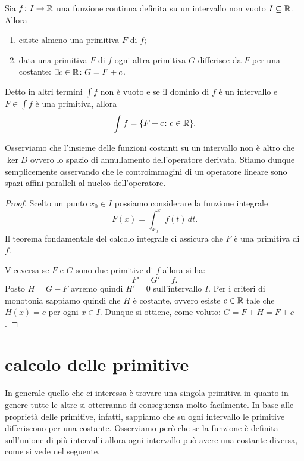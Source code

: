 \begin{theorem}
\label{th:primitive}
\mymark{***}
Sia $f\colon I \to \mathbb R$
una funzione continua definita su un intervallo non vuoto $I\subseteq \mathbb R$. Allora
\begin{enumerate}
\item esiste almeno una primitiva $F$ di $f$;
\item data una primitiva $F$ di $f$ ogni altra
primitiva $G$ differisce da $F$ per una costante: $\exists c\in \mathbb R\colon G= F+c$.
\end{enumerate}

Detto in altri termini $\int f$ non è vuoto e se il dominio di $f$ è un
intervallo e
$F\in \int f$ è una primitiva, allora
\[
  \int f = {\left\{ F+c \colon c \in \mathbb R \right\}}.
\]
\end{theorem}

Osserviamo che l'insieme delle funzioni costanti
su un intervallo
non è altro che $\ker D$ ovvero lo spazio di annullamento dell'operatore derivata.
Stiamo dunque semplicemente osservando che le controimmagini di un operatore
lineare sono spazi affini paralleli al nucleo dell'operatore.

\begin{proof}
\mymark{***}
Scelto un punto $x_0\in I$ possiamo
considerare la funzione integrale
\[
  F(x) = \int_{x_0}^x f(t)\, dt.
\]
Il teorema fondamentale del calcolo integrale
ci assicura che $F$ è una primitiva di $f$.

Viceversa se $F$ e $G$ sono due primitive di $f$ allora si ha:
\[
  F' = G' = f.
\]
Posto $H=G-F$ avremo quindi $H'=0$ sull'intervallo $I$. Per i criteri di
monotonia sappiamo quindi che $H$ è costante, ovvero esiste $c\in \mathbb R$ tale
che $H(x)=c$ per ogni $x\in I$. Dunque si ottiene, come voluto: $G=F+H=F+c$.
\end{proof}

\section{calcolo delle primitive}

In generale quello che ci interessa è trovare una singola primitiva in quanto
in genere tutte le altre si otterranno di conseguenza molto facilmente.
In base alle proprietà delle primitive, infatti, sappiamo che su ogni
intervallo le primitive differiscono per una costante. Osserviamo però
che se la funzione è definita sull'unione di più intervalli allora ogni
intervallo può avere una costante diversa, come si vede nel seguente.

